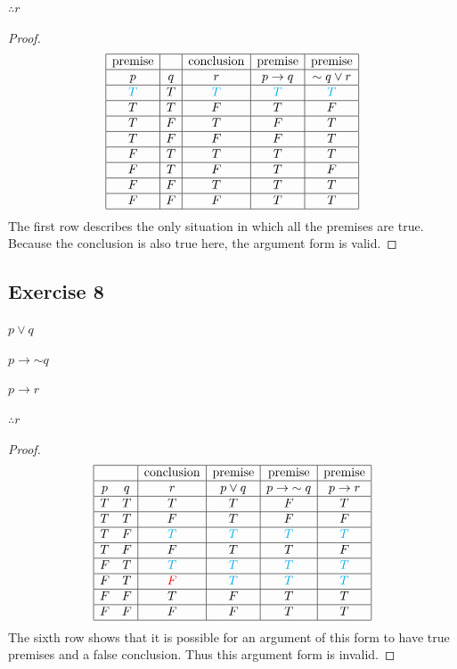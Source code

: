\documentclass[14pt]{extarticle}
\begin{document}
$\therefore r$

\begin{proof} 
$$ 
\begin{array}{|c|c|c|c|c|} 
\hline 
\text{premise} & & \text{conclusion} & \text{premise} & \text{premise} \\ 
\hline 
p & q & r & p \to q & {\sim q} \vee r \\ 
\hline 
\color{cyan} T & T & \color{cyan} T & \color{cyan} T & \color{cyan} T \\ 
\hline 
T & T & F & T & F \\ 
\hline 
T & F & T & F & T \\
\hline 
T & F & F & F & T \\ 
\hline 
F & T & T & T & T \\ 
\hline 
F & T & F & T & F \\ 
\hline 
F & F & T & T & T \\ 
\hline 
F & F & F & T & T \\ 
\hline 
\end{array}
$$
The first row describes the only situation in which all the premises are true. Because the conclusion is also true here, the argument form is valid.
\end{proof}

\subsection{Exercise 8} 
$p \vee q$

$p \to {\sim q}$

$p \to r$

$\therefore r$

\begin{proof} 
$$ 
\begin{array}{|cc|c|c|c|c|} 
\hline 
& & \text{conclusion} & \text{premise} & \text{premise} & \text{premise} \\ 
\hline 
p & q & r & p \vee q & p \to {\sim q} & p \to r \\ 
\hline 
T & T & T & T & F & T \\ 
\hline 
T & T & F & T & F & F \\ 
\hline 
T & F & \color{cyan} T & \color{cyan} T & \color{cyan} T & \color{cyan} T \\ 
\hline 
T & F & F & T & T & F \\ 
\hline 
F & T & \color{cyan} T & \color{cyan} T & \color{cyan} T & \color{cyan} T \\ 
\hline 
F & T & \color{red} F & \color{cyan} T & \color{cyan} T & \color{cyan} T \\ 
\hline 
F & F & T & F & T & T \\ 
\hline 
F & F & F & F & T & T \\ 
\hline 
\end{array} 
$$ 
The sixth row shows that it is possible for an argument of this form to have true premises and a false conclusion. Thus this argument form is invalid. 
\end{proof}
\end{document}
